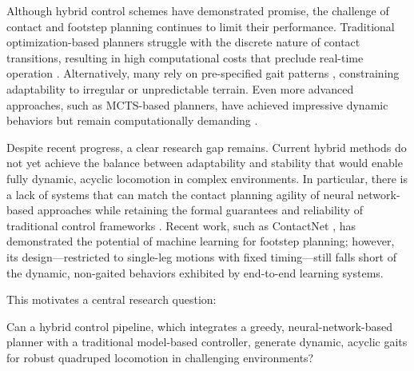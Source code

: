 Although hybrid control schemes have demonstrated promise, the
challenge of contact and footstep planning continues to limit their
performance. Traditional optimization-based planners struggle with
the discrete nature of contact transitions, resulting in high
computational costs that preclude real-time operation
\cite{winkler_gait_2018}. Alternatively, many rely on pre-specified
gait patterns \cite{xie_glide_2023, grandia_perceptive_2022,
lee_learning_2020, villarreal_fast_2019}, constraining adaptability
to irregular or unpredictable terrain. Even more advanced approaches,
such as MCTS-based planners, have achieved impressive dynamic
behaviors but remain computationally demanding
\cite{amatucci_monte_2022, taouil_non-gaited_2025}.

Despite recent progress, a clear research gap remains. Current hybrid
methods do not yet achieve the balance between adaptability and
stability that would enable fully dynamic, acyclic locomotion in
complex environments. In particular, there is a lack of systems that
can match the contact planning agility of neural network-based
approaches while retaining the formal guarantees and reliability of
traditional control frameworks \cite{Meng2023Mar, Wensing2022Nov}.
Recent work, such as ContactNet \cite{bratta_contactnet_2024}, has
demonstrated the potential of machine learning for footstep planning;
however, its design—restricted to single-leg motions with fixed
timing—still falls short of the dynamic, non-gaited behaviors
exhibited by end-to-end learning systems.

This motivates a central research question:

\begin{emphasis}
  Can a hybrid control pipeline, which integrates a greedy,
  neural-network-based planner with a traditional   model-based
  controller, generate dynamic, acyclic gaits for robust   quadruped
  locomotion in challenging environments?
\end{emphasis}
